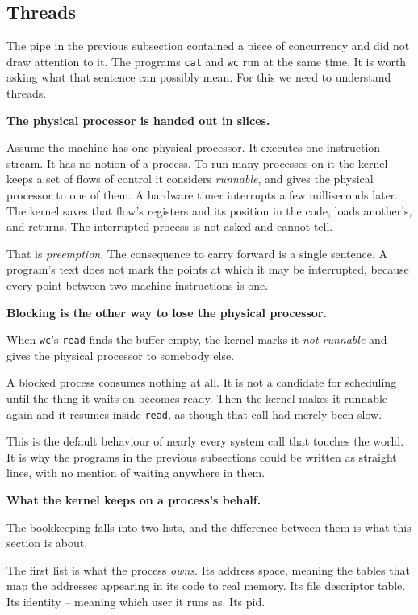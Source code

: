 \documentclass[11pt,a4paper]{article}
\begin{document}
\subsection{Threads}
\label{sec:threads}

The pipe in the previous subsection contained a piece of concurrency and did not draw attention to
it. The programs \texttt{cat} and \texttt{wc} run at the same time. It is worth asking what that
sentence can possibly mean. For this we need to understand threads.

\textbf{The physical processor is handed out in slices.}

Assume the machine has one physical processor. It executes one instruction stream. It has no notion
of a process. To run many processes on it the kernel keeps a set of flows of control it considers
\emph{runnable}, and gives the physical processor to one of them. A hardware timer interrupts a few milliseconds later. The kernel saves
that flow's registers and its position in the code, loads another's, and returns. The interrupted
process is not asked and cannot tell.

That is \emph{preemption}. The consequence to carry forward is a single sentence. A program's text
does not mark the points at which it may be interrupted, because every point between two machine
instructions is one.

\textbf{Blocking is the other way to lose the physical processor.}

When \texttt{wc}'s \texttt{read} finds the buffer empty, the kernel marks it \emph{not runnable}
and gives the physical processor to somebody else.

A blocked process consumes nothing at all. It
is not a candidate for scheduling until the thing it waits on becomes ready. Then the kernel makes
it runnable again and it resumes inside \texttt{read}, as though that call had merely been slow.

This is the default behaviour of nearly every system call that touches the world. It is why the
programs in the previous subsections could be written as straight lines, with no mention of waiting
anywhere in them.

\textbf{What the kernel keeps on a process's behalf.}

The bookkeeping falls into two lists, and the difference between them is what this section is
about.

The first list is what the process \emph{owns}. Its address space, meaning the tables that map the
addresses appearing in its code to real memory. Its file descriptor table. Its identity -- meaning
which user it runs as. Its pid.
\end{document}
